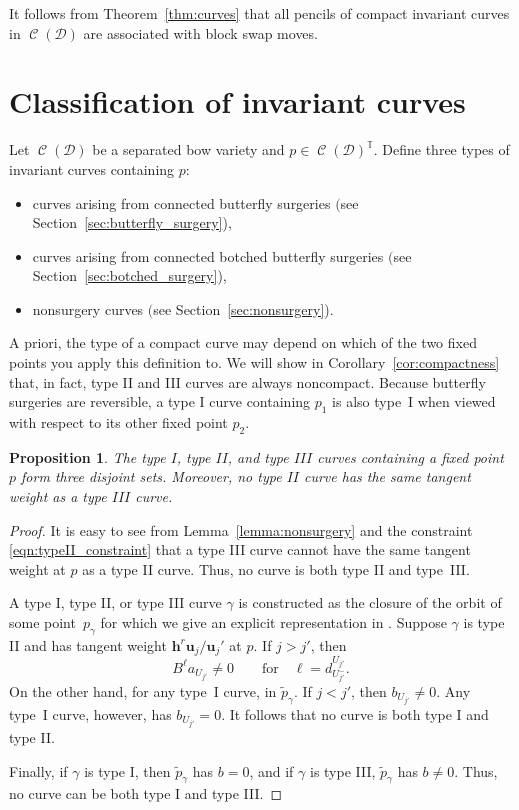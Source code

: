 \documentclass[pdftex]{sigma}
\numberwithin{equation}{section}
\newtheorem{Proposition}[Theorem]{Proposition}
 { \theoremstyle{definition}
\newtheorem{Definition}[Theorem]{Definition}
\newtheorem{Note}[Theorem]{Note}
\newtheorem{Example}[Theorem]{Example}
\newtheorem{Remark}[Theorem]{Remark} }
\newcommand{\brane}{\mathcal D}
\newcommand{\torus}{\mathbb T}
\newcommand{\MM}{\mathbb M}
\newcommand{\hb}{\mathbf h}
\newcommand{\ub}{\mathbf u}
\newcommand{\prequot}{\widetilde \MM^s}
\DeclareMathOperator{\bowvar}{\mathcal C}
\begin{document}
It follows from Theorem~\ref{thm:curves} that all pencils of compact invariant curves in $\bowvar(\brane)$ are associated with block swap moves.


\section{Classification of invariant curves} \label{sec:classification}
\begin{Definition}
Let $\bowvar(\brane)$ be a separated bow variety and $p\in\bowvar(\brane)^\torus$. Define three types of invariant curves containing $p$:
\begin{itemize}\itemsep=0pt
\item[$\rm I)$] curves arising from connected butterfly surgeries $($see Section~{\rm\ref{sec:butterfly_surgery})},
\item[$\rm II)$] curves arising from connected botched butterfly surgeries $($see Section~{\rm\ref{sec:botched_surgery})},
\item[$\rm III)$] nonsurgery curves $($see Section~{\rm\ref{sec:nonsurgery})}.
\end{itemize}
\end{Definition}
A priori, the type of a compact curve may depend on which of the two fixed points you apply this definition to. We will show in Corollary~\ref{cor:compactness} that, in fact, type II and III curves are always noncompact. Because butterfly surgeries are reversible, a type I curve containing $p_1$ is also type~I when viewed with respect to its other fixed point $p_2$.

\begin{Proposition} \label{prop:disjoint_types}
The type $I$, type $II$, and type $III$ curves containing a fixed point $p$ form three disjoint sets. Moreover, no type $II$ curve has the same tangent weight as a type $III$ curve.
\end{Proposition}

\begin{proof}
It is easy to see from Lemma~\ref{lemma:nonsurgery} and the constraint \eqref{eqn:typeII_constraint} that a type III curve cannot have the same tangent weight at $p$ as a type II curve. Thus, no curve is both type II and type~III.

A type I, type II, or type III curve $\gamma$ is constructed as the closure of the orbit of some point~$p_\gamma$ for which we give an explicit representation in \smash{$\tilde{p}_\gamma \in \prequot$}. Suppose $\gamma$ is type II and has tangent weight $\hb^r \ub_j/\ub_j'$ at $p$. If $j > j'$, then
\[
B^\ell a_{U_{j'}} \neq 0 \qquad \text{for} \quad \ell = d_{U_{j'}^-}^{U_{j'}}.
\]
On the other hand, for any type~I curve,  in $\tilde{p}_\gamma$. If $j < j'$, then $b_{U_{j'}} \neq 0$. Any type~I curve, however, has $b_{U_{j'}} = 0$. It follows that no curve is both type I and type II.

Finally, if $\gamma$ is type I, then $\tilde{p}_\gamma$ has $b=0$, and if $\gamma$ is type III, $\tilde{p}_\gamma$ has $b\neq 0$. Thus, no curve can be both type I and type III.
\end{proof}
\end{document}
